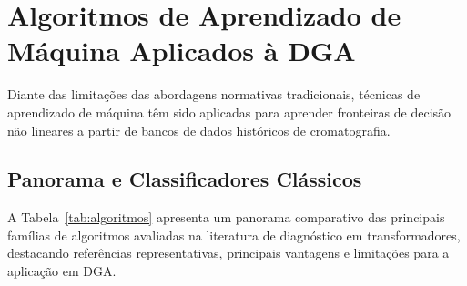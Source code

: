 \section{Algoritmos de Aprendizado de Máquina Aplicados à DGA}\label{sec:algoritmos_ml}

Diante das limitações das abordagens normativas tradicionais, técnicas de aprendizado de máquina têm sido aplicadas para aprender fronteiras de decisão não lineares a partir de bancos de dados históricos de cromatografia.

\subsection{Panorama e Classificadores Clássicos}\label{sec:panorama_classificadores}

A Tabela~\ref{tab:algoritmos} apresenta um panorama comparativo das principais famílias de algoritmos avaliadas na literatura de diagnóstico em transformadores, destacando referências representativas, principais vantagens e limitações para a aplicação em DGA.

\renewcommand{\arraystretch}{1.4}

